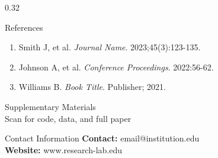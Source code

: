 \documentclass[final,t]{beamer}
\begin{document}
\begin{frame}[t]
\begin{columns}[t]
\begin{column}{0.32\paperwidth}
  \vspace{1em}

  \begin{block}{References}
    \footnotesize
    \begin{enumerate}
      \item Smith J, et al. \textit{Journal Name}. 2023;45(3):123-135.
      \item Johnson A, et al. \textit{Conference Proceedings}. 2022:56-62.
      \item Williams B. \textit{Book Title}. Publisher; 2021.
    \end{enumerate}
  \end{block}

  \vspace{1em}

  \begin{block}{Supplementary Materials}
    \centering
    \\
    \vspace{0.3em}
    \small Scan for code, data, and full paper
  \end{block}

  \vspace{1em}

  \begin{block}{Contact Information}
    \centering
    \textbf{Contact:} email@institution.edu\\
    \textbf{Website:} www.research-lab.edu
  \end{block}

\end{column}

\end{columns}

\vspace{2em}

\end{frame}
\end{document}
